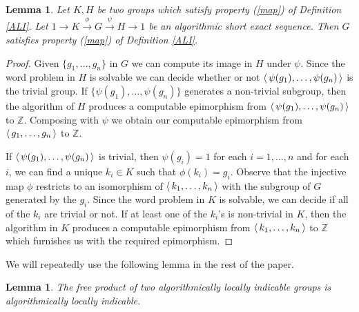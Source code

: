 \documentclass[12pt, a4paper]{amsart}
\newtheorem{Lem}[Thm]{Lemma}
\theoremstyle{remark}
\theoremstyle{definition}
\begin{document}
\begin{Lem} \label{lem:extconst}
Let $K, H$ be two groups which satisfy property (\ref{map}) of Definition \ref{ALI}. Let $1\to K\stackrel{\phi}{\to} G\stackrel{\psi}{\to} H\to 1$ be an algorithmic short exact sequence. Then $G$ satisfies property (\ref{map}) of Definition \ref{ALI}. 
\end{Lem}
\begin{proof}
Given $\{g_1,\dots, g_n\}$ in $G$ we can compute its image in $H$ under $\psi$. Since the word problem in $H$ is solvable we can decide whether or not ${\langle\mkern3mu{\psi(g_1),\dots, \psi(g_n)}\mkern3mu\rangle}$ is the trivial group. If $\{\psi(g_1),\dots, \psi(g_n)\}$ generates a non-trivial subgroup, then the algorithm of $H$ produces a computable epimorphism  from ${\langle\mkern3mu{\psi(g_1),\dots, \psi(g_n)}\mkern3mu\rangle}$ to ${\mathbb{Z}}$. Composing with $\psi$ we obtain our computable epimorphism from ${\langle\mkern3mu{g_1,\dots, g_n}\mkern3mu\rangle}$ to ${\mathbb{Z}}$.

If ${\langle\mkern3mu{\psi(g_1),\dots, \psi(g_n)}\mkern3mu\rangle}$ is trivial, then $\psi(g_i)=1$ for each $i=1,\dots, n$ and for each $i$, we can find a unique $k_i\in K$ such that $\phi(k_i)=g_i$. Observe that the injective map $\phi$ restricts to an isomorphism of ${\langle\mkern3mu{k_1,\dots, k_n}\mkern3mu\rangle}$ with the subgroup of $G$ generated by the $g_i$. Since the word problem in $K$ is solvable, we can decide if all of the $k_i$ are trivial or not. If at least one of the $k_i$'s is non-trivial in $K$, then the algorithm in $K$ produces a computable epimorphism from ${\langle\mkern3mu{k_1,\dots, k_n}\mkern3mu\rangle}$ to ${\mathbb{Z}}$ which furnishes us with the required epimorphism. 
\end{proof}

\noindent We will repeatedly use the following lemma in the rest of the paper. 
\begin{Lem} \label{lem:free_prod} The free product of two algorithmically locally indicable groups is algorithmically locally indicable. 
\end{Lem}
\end{document}
